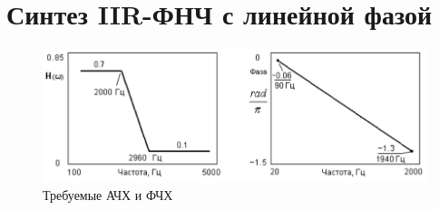 \documentclass[a4paper,14pt]{extarticle}
\begin{document}
\section{Синтез IIR-ФНЧ с линейной фазой}
\begin{figure}[H]
  \centering
  \includegraphics[width=\textwidth]{img/img5.png}
  \caption{Требуемые АЧХ и ФЧХ}
  \label{fig:}
\end{figure}
\end{document}
